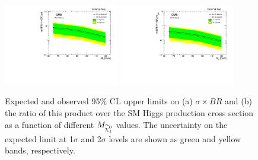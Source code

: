 \begin{figure}[H]
\centering
{\includegraphics[width=0.45\textwidth]{PAS_Plots2/limit_xsec.pdf}}
{\includegraphics[width=0.45\textwidth]{PAS_Plots2/limit_ratio.pdf}}
\caption{ Expected and observed 95\% CL upper limits on (a) $\sigma \times BR$ and (b) the ratio of this product over the SM Higgs production cross section as a function of different $M_{\widetilde{\chi}^{0}_{1}}$ values. The uncertainty on the expected limit at 1$\sigma$ and 2$\sigma$ levels are shown as green and yellow bands, respectively. }
\label{fig:limit_higgs}    
\end{figure}




